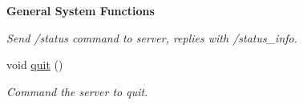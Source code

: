 \begin{Indent}{\bf General System Functions}
\begin{DoxyCompactItemize}
\begin{DoxyCompactList}\small\item\em Send /status command to server, replies with /status\-\_\-info. \end{DoxyCompactList}\item 
\hypertarget{classsc_1_1SCServer_aa148428f939df4dbad71639a3273f312}{void \hyperlink{classsc_1_1SCServer_aa148428f939df4dbad71639a3273f312}{quit} ()}\label{classsc_1_1SCServer_aa148428f939df4dbad71639a3273f312}

\begin{DoxyCompactList}\small\item\em Command the server to quit. \end{DoxyCompactList}\end{DoxyCompactItemize}
\end{Indent}
